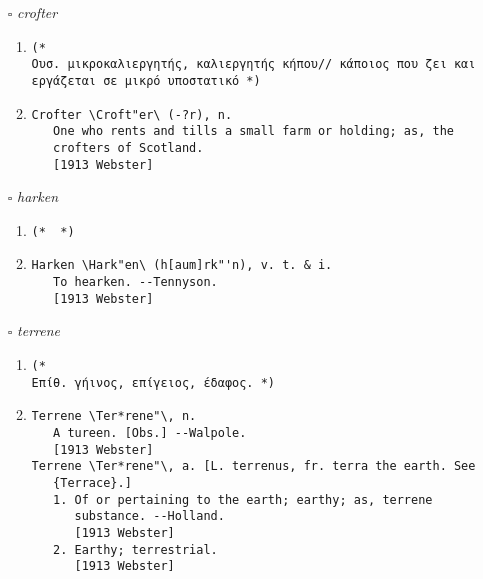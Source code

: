 \documentclass{article}
\begin{document}
\begin{itemize}
\begin{enumerate}
{\begin{lstlisting}
(*  *)
\end{lstlisting}}
\item{
\begin{lstlisting}
Agronomy \A*gron"o*my\, n. [Gr. ? rural; as a noun, an overseer
   of the public lands; ? field + ? usage, ? to deal out,
   manage: cf. F. agronomie.]
   The management of land; rural economy; agriculture.
   [1913 Webster]
\end{lstlisting}}
\end{enumerate}
\item[$\square$] \emph{ crofter }
\begin{enumerate}
\item{
\begin{lstlisting}
(* 
Ουσ. μικροκαλιεργητής, καλιεργητής κήπου// κάποιος που ζει και εργάζεται σε μικρό υποστατικό *)
\end{lstlisting}}
\item{
\begin{lstlisting}
Crofter \Croft"er\ (-?r), n.
   One who rents and tills a small farm or holding; as, the
   crofters of Scotland.
   [1913 Webster]
\end{lstlisting}}
\end{enumerate}
\item[$\square$] \emph{ harken }
\begin{enumerate}
\item{
\begin{lstlisting}
(*  *)
\end{lstlisting}}
\item{
\begin{lstlisting}
Harken \Hark"en\ (h[aum]rk"'n), v. t. & i.
   To hearken. --Tennyson.
   [1913 Webster]
\end{lstlisting}}
\end{enumerate}
\item[$\square$] \emph{ terrene }
\begin{enumerate}
\item{
\begin{lstlisting}
(* 
Επίθ. γήινος, επίγειος, έδαφος. *)
\end{lstlisting}}
\item{
\begin{lstlisting}
Terrene \Ter*rene"\, n.
   A tureen. [Obs.] --Walpole.
   [1913 Webster]
Terrene \Ter*rene"\, a. [L. terrenus, fr. terra the earth. See
   {Terrace}.]
   1. Of or pertaining to the earth; earthy; as, terrene
      substance. --Holland.
      [1913 Webster]
   2. Earthy; terrestrial.
      [1913 Webster]

\end{lstlisting}}
\end{enumerate}
\end{itemize}
\end{document}
